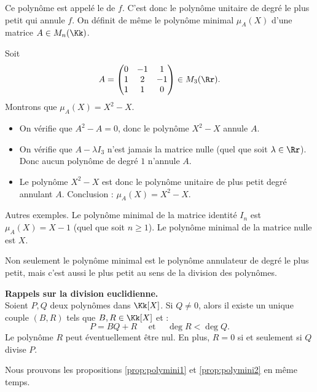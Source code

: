 \documentclass[12pt, class=report,crop=false]{standalone}
\begin{document}
Ce polynôme est appelé le  de $f$.
C'est donc le polynôme unitaire de degré le plus petit qui annule $f$.
On définit de même le polynôme minimal $\mu_A(X)$ d'une matrice $A \in M_n(\Kk)$.


\begin{exemple}
Soit 
\[
A = 
\begin{pmatrix}
0 & -1 & 1 \\
1 & 2 & -1 \\
1 & 1 & 0
\end{pmatrix} \in M_3(\Rr).\]
Montrons que $\mu_A(X) = X^2-X$.
\begin{itemize}	
  \item On vérifie que $A^2-A = 0$, donc le polynôme $X^2-X$ annule $A$.
  
  \item On vérifie que $A-\lambda I_3$ n'est jamais la matrice nulle (quel que soit $\lambda \in \Rr$). Donc aucun polynôme de degré $1$ n’annule $A$.
  
  \item Le polynôme $X^2-X$ est donc le polynôme unitaire de plus petit degré annulant $A$. Conclusion : $\mu_A(X) = X^2-X$.
\end{itemize}
\end{exemple} 

Autres exemples. Le polynôme minimal de la matrice identité $I_n$ est $\mu_A(X) = X -1$ (quel que soit $n\ge1$). Le polynôme minimal de la matrice nulle est $X$.

\bigskip

Non seulement le polynôme minimal est le polynôme annulateur de degré le plus petit,
mais c'est aussi le plus petit au sens de la division des polynômes.
\begin{proposition}
\label{prop:polymini2}
\sauteligne
{} 
\end{proposition}

\textbf{Rappels sur la division euclidienne.}\\
Soient $P,Q$ deux polynômes dans $\Kk[X]$. Si $Q \neq 0$, alors il existe un unique couple $(B,R)$ tels que $B,R \in \Kk[X]$ et :
\[P=BQ+R \quad \text{ et } \quad \deg R < \deg Q.\]
Le polynôme $R$ peut éventuellement être  nul. En plus, $R=0$ si et seulement si $Q$ divise $P$.


Nous prouvons les propositions \ref{prop:polymini1} et \ref{prop:polymini2} en même temps.
\end{document}
